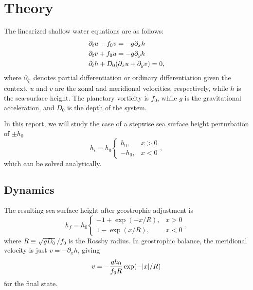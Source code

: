 \section{Theory}
\label{sec:theory}

The linearized shallow water equations are as follows:
	\begin{align}
		&\partial_t u - f_0 v = -g \partial_x h \label{eq:dudt} \\
		&\partial_t v + f_0 u = -g \partial_y h \label{eq:dvdt} \\
		&\partial_t h + D_0 \qty(\partial_x u + \partial_y v) = 0, \label{eq:dhdt}
	\end{align}
where $\partial_{q_i}$ denotes partial differentiation or ordinary differentiation given the context. $u$ and $v$ are the zonal and meridional velocities, respectively, while $h$ is the sea-surface height. The planetary vorticity is $f_0$, while $g$ is the gravitational acceleration, and $D_0$ is the depth of the system. 

In this report, we will study the case of a stepwise sea surface height perturbation of $\pm h_0$
	\begin{equation}
		h_i = h_0
			\begin{cases}
			h_0, & x > 0 \\
			-h_0, & x < 0
			\end{cases},
	\label{eq:initial_h}
	\end{equation}
which can be solved analytically.

\subsection{Dynamics}
The resulting sea surface height after geostrophic adjustment is
	\begin{equation}
		h_f = h_0
			\begin{cases}
				-1 + \exp(-x / R), & x > 0\\
				1 - \exp(x / R), & x < 0
			\end{cases},
	\label{eq:analytical_h}
	\end{equation}
where $R \equiv \sqrt{gD_0} / f_0$ is the Rossby radius. In geostrophic balance, the meridional velocity is just $v = -\partial_x h$, giving
	\begin{equation}
		v = -\frac{g h_0}{f_0R} \exp(-\abs{x} / R)
	\label{analytical_v}
	\end{equation}
for the final state.

